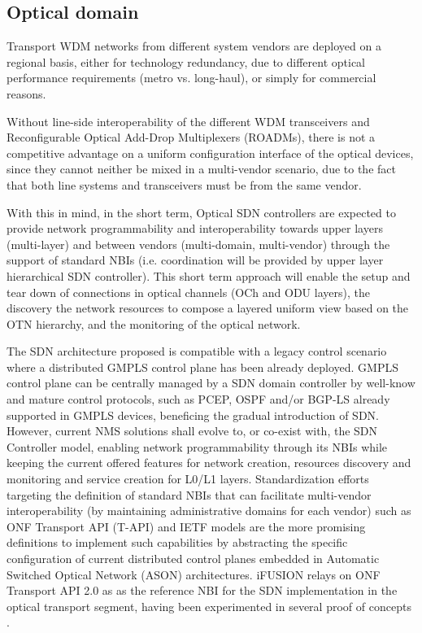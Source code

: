 \documentclass[a4paper,fleqn]{cas-dc}
\begin{document}
\subsection{Optical domain}
\label{section:dwdm}
Transport WDM networks from different system vendors are deployed on a regional basis, either for technology redundancy, due to different optical performance requirements (metro vs. long-haul), or simply for commercial reasons. 

Without line-side interoperability of the different WDM transceivers and Reconfigurable Optical Add-Drop Multiplexers (ROADMs), there is not a competitive advantage on a uniform configuration interface of the optical devices, since they cannot neither be mixed in a multi-vendor scenario, due to the fact that both line systems and transceivers must be from the same vendor.

With this in mind, in the short term, Optical SDN controllers are expected to provide network programmability and interoperability towards upper layers (multi-layer) and between vendors (multi-domain, multi-vendor) through the support of standard NBIs (i.e. coordination will be provided by upper layer hierarchical SDN controller). This short term approach will enable the setup and tear down of connections in optical channels (OCh and ODU layers), the discovery the network resources to compose a layered uniform view based on the OTN hierarchy, and the monitoring of the optical network. 

The SDN architecture proposed is compatible with a legacy control scenario where a distributed GMPLS control plane has been already deployed. GMPLS control plane can be centrally managed by a SDN domain controller by well-know and mature control protocols, such as PCEP, OSPF and/or BGP-LS already supported in GMPLS devices, beneficing the gradual introduction of SDN. However, current NMS solutions shall evolve to, or co-exist with, the SDN Controller model, enabling network programmability through its NBIs while keeping the current offered features for network creation, resources discovery and monitoring and service creation for L0/L1 layers. Standardization efforts targeting the definition of standard NBIs that can facilitate multi-vendor interoperability (by maintaining administrative domains for each vendor) such as ONF Transport API (T-API) \cite{lopez2016transport} and IETF models \cite{wu2017service} are the more promising definitions to implement such capabilities by abstracting the specific configuration of current distributed control planes embedded in Automatic Switched Optical Network (ASON) architectures. 
iFUSION relays on ONF Transport API 2.0 as as the reference NBI for the SDN implementation in the optical transport segment, having been experimented in several proof of concepts \cite{mayoral2016first,mayoral2017control,bravalheri2019vnf}. 
\end{document}
